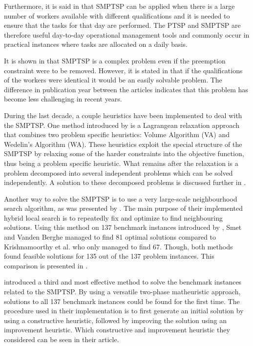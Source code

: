 Furthermore, it is said in \citet{krishnamoorthy_2012} that SMPTSP can be applied when there is a large number of workers available with different qualifications and it is needed to ensure that the tasks for that day are performed. The PTSP and SMPTSP are therefore useful day-to-day operational management tools and commonly occur in practical instances where tasks are allocated on a daily basis.

It is shown in \citet{kroon_1995} that SMPTSP is a complex problem even if the preemption constraint were to be removed. However, it is stated in \citet{krishnamoorthy_2012} that if the qualifications of the workers were identical it would be an easily solvable problem. The difference in publication year between the articles indicates that this problem has become less challenging in recent years.

During the last decade, a couple heuristics have been implemented to deal with the SMPTSP. One method introduced by \citet{krishnamoorthy_2012} is a Lagrangean relaxation approach that combines two problem specific heuristics: Volume Algorithm (VA) and Wedelin's Algorithm (WA). These heuristics exploit the special structure of the SMPTSP by relaxing some of the harder constraints into the objective function, thus being a problem specific heuristic. What remains after the relaxation is a problem decomposed into several independent problems which can be solved independently. A solution to these decomposed problems is discussed further in \citet{krishnamoorthy_2012}.

Another way to solve the SMPTSP is to use a very large-scale neighbourhood search algorithm, as was presented by \citet{smet_2012}. The main purpose of their implemented hybrid local search is to repeatedly fix and optimize to find neighbouring solutions. Using this method on 137 benchmark instances introduced by \citet{krishnamoorthy_2012}, Smet and Vanden Berghe managed to find 81 optimal solutions compared to Krishnamoorthy et al. who only managed to find 67. Though, both methods found feasible solutions for 135 out of the 137 problem instances. This comparison is presented in \citet{smet_2014}.

\citet{smet_2014} introduced a third and most effective method to solve the benchmark instances related to the SMPTSP. By using a versatile two-phase matheuristic approach, solutions to all 137 benchmark instances could be found for the first time. The procedure used in their implementation is to first generate an initial solution by using a constructive heuristic, followed by improving the solution using an improvement heuristic. Which constructive and improvement heuristic they considered can be seen in their article.


